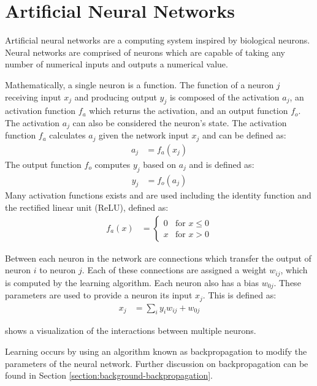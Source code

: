 \section{Artificial Neural Networks}
Artificial neural networks are a computing system inspired by biological neurons. Neural networks are comprised of neurons which are capable of taking any number of numerical inputs and outputs a numerical value.



Mathematically, a single neuron is a function.
The function of a neuron $j$ receiving input $x_j$ and producing output $y_j$ is composed of the activation $a_j$, an activation function $f_a$ which returns the activation, and an output function $f_{o}$.
The activation $a_j$ can also be considered the neuron's state.
The activation function $f_a$ calculates $a_j$ given the network input $x_j$ and can be defined as:
\begin{align}
	a_j &= f_a\left(x_j\right)
\end{align}
The output function $f_o$ computes $y_j$ based on $a_j$ and is defined as:
\begin{align}
	y_j &= f_o\left(a_j\right)
\end{align}
Many activation functions exists and are used including the identity function and the rectified linear unit (ReLU), defined as:
\begin{align}
	f_a(x) &= 
	\begin{cases}
		0	& \text{for } x \leq 0\\
		x	& \text{for } x > 0
	\end{cases}
\end{align}

Between each neuron in the network are connections which transfer the output of neuron $i$ to neuron $j$. Each of these connections are assigned a weight $w_{ij}$, which is computed by the learning algorithm.
Each neuron also has a bias $w_{0j}$.
These parameters are used to provide a neuron its input $x_j$. This is defined as:
\begin{align}
	x_j &= \sum_{i}y_iw_{ij} + w_{0j}
\end{align}

 shows a visualization of the interactions between multiple neurons.

Learning occurs by using an algorithm known as backpropagation to modify the parameters of the neural network.
Further discussion on backpropagation can be found in Section \ref{section:background-backpropagation}.

